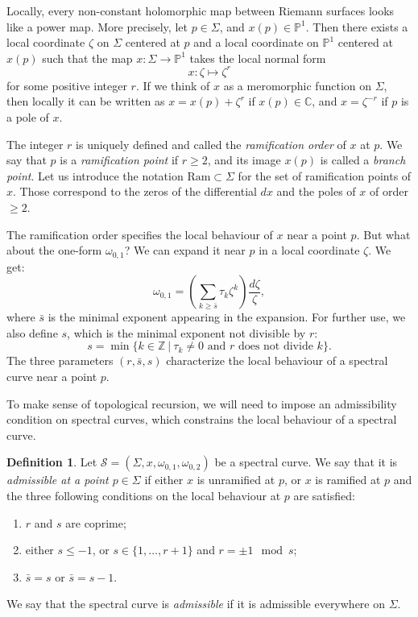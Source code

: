 \documentclass[reqno,oneside,11pt]{amsart}
\theoremstyle{plain}
\theoremstyle{definition}
\newtheorem{definition}[theorem]{Definition}
\theoremstyle{remark}
\numberwithin{equation}{section}
\newcommand{\Ra}{\text{Ram}}
\begin{document}
Locally, every non-constant holomorphic map between Riemann surfaces looks like a power map. More precisely, let $p \in \Sigma$, and $x(p) \in \mathbb{P}^1$. Then there exists a local coordinate $\zeta$ on $\Sigma$ centered at $p$ and a local coordinate on $\mathbb{P}^1$ centered at $x(p)$ such that the map $x: \Sigma \to \mathbb{P}^1$ takes the local normal form
\begin{equation}
x: \zeta \mapsto \zeta^r
\end{equation}
for some positive integer $r$. If we think of $x$ as a meromorphic function on $\Sigma$, then locally it can be written as $x = x(p) + \zeta^r$ if $x(p) \in \mathbb{C}$, and $x = \zeta^{-r}$ if $p$ is a pole of $x$.

The integer $r$ is uniquely defined and called the \emph{ramification order} of $x$ at $p$. We say that $p$ is a \emph{ramification point} if $r \geq 2$, and its image $x(p)$ is called a \emph{branch point}. Let us introduce the notation $\Ra \subset \Sigma$ for the set of ramification points of $x$. Those correspond to the zeros of the differential $dx$ and the poles of $x$ of order $\geq 2$.

The ramification order specifies the local behaviour of $x$ near a point $p$. But what about the one-form $\omega_{0,1}$? We can expand it near $p$ in a local coordinate $\zeta$. We get:
\begin{equation}
\omega_{0,1} = \left( \sum_{k \geq \bar s} \tau_k \zeta^k \right) \frac{d \zeta}{\zeta},
\end{equation}
where $\bar s$ is the minimal exponent appearing in the expansion. For further use, we also define $s$, which is the minimal exponent not divisible by $r$:
\begin{equation}
s = \min\{ k \in \mathbb{Z} ~|~ \tau_k \neq 0 \text{ and $r$ does not divide $k$} \}.
\end{equation}
The three parameters $(r,\bar s, s)$ characterize the local behaviour of a spectral curve near a point $p$.

To make sense of topological recursion, we will need to impose an admissibility condition on spectral curves, which constrains the local behaviour of a spectral curve.

\begin{definition}\label{d:admissible}
Let  $\mathcal{S} = (\Sigma,x,\omega_{0,1}, \omega_{0,2})$ be a spectral curve. We say that it is \emph{admissible at a point $p \in \Sigma$} if either $x$ is unramified at $p$, or $x$ is ramified at $p$ and the three following conditions on the local behaviour at $p$ are satisfied:
\begin{enumerate}
\item $r$ and $s$ are coprime;
\item either $s \leq -1$, or $s \in \{1, \ldots, r+1 \}$ and $r = \pm 1 \mod s$;
\item $\bar s = s$ or $\bar s = s -1$.
\end{enumerate}
We say that the spectral curve is \emph{admissible} if it is admissible everywhere on $\Sigma$.
\end{definition}
\end{document}
